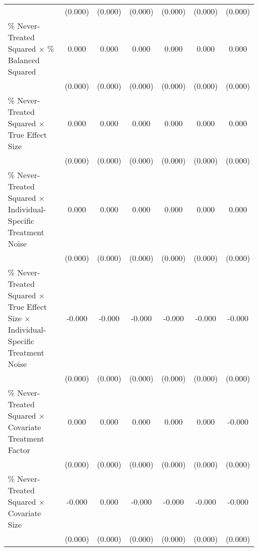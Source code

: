 \begin{table}[htbp]
\begin{tabular}{l*{6}{c}}
                    &     (0.000)         &     (0.000)         &     (0.000)         &     (0.000)         &     (0.000)         &     (0.000)         \\
\% Never-Treated Squared $\times$ \% Balanced Squared&       0.000\sym{***}&       0.000\sym{***}&       0.000\sym{***}&       0.000\sym{***}&       0.000\sym{***}&       0.000\sym{***}\\
                    &     (0.000)         &     (0.000)         &     (0.000)         &     (0.000)         &     (0.000)         &     (0.000)         \\
\% Never-Treated Squared $\times$ True Effect Size&       0.000         &       0.000         &       0.000         &       0.000\sym{*}  &       0.000         &       0.000\sym{*}  \\
                    &     (0.000)         &     (0.000)         &     (0.000)         &     (0.000)         &     (0.000)         &     (0.000)         \\
\% Never-Treated Squared $\times$ Individual-Specific Treatment Noise&       0.000\sym{**} &       0.000\sym{**} &       0.000\sym{**} &       0.000         &       0.000\sym{*}  &       0.000\sym{*}  \\
                    &     (0.000)         &     (0.000)         &     (0.000)         &     (0.000)         &     (0.000)         &     (0.000)         \\
\% Never-Treated Squared $\times$ True Effect Size $\times$ Individual-Specific Treatment Noise&      -0.000\sym{*}  &      -0.000\sym{**} &      -0.000         &      -0.000         &      -0.000         &      -0.000         \\
                    &     (0.000)         &     (0.000)         &     (0.000)         &     (0.000)         &     (0.000)         &     (0.000)         \\
\% Never-Treated Squared $\times$ Covariate Treatment Factor&       0.000\sym{***}&       0.000         &       0.000         &       0.000         &       0.000\sym{***}&      -0.000         \\
                    &     (0.000)         &     (0.000)         &     (0.000)         &     (0.000)         &     (0.000)         &     (0.000)         \\
\% Never-Treated Squared $\times$ Covariate Size&      -0.000         &       0.000         &      -0.000         &      -0.000\sym{*}  &      -0.000         &      -0.000\sym{*}  \\
                    &     (0.000)         &     (0.000)         &     (0.000)         &     (0.000)         &     (0.000)         &     (0.000)         \\

\end{tabular}
\end{table}
